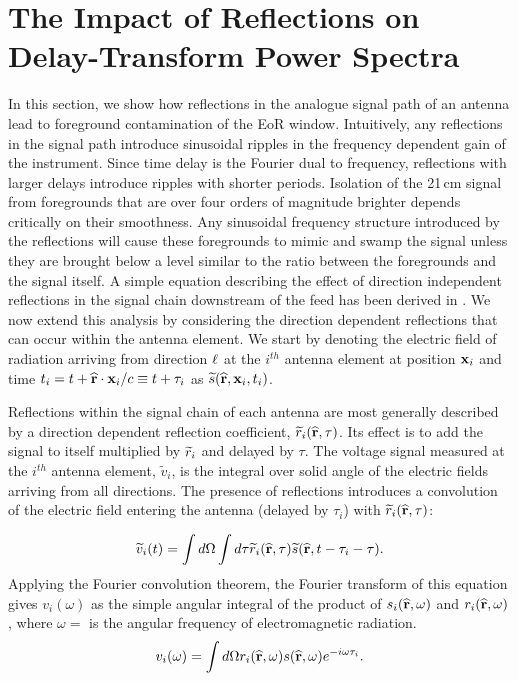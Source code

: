 \documentclass[twocolumn]{emulateapj}
\begin{document}
\section{The Impact of Reflections on Delay-Transform Power Spectra}\label{sec:Formalism}
In this section, we show how reflections in the analogue signal path of an antenna lead to foreground contamination of the EoR window. Intuitively, any reflections in the signal path introduce sinusoidal ripples in the frequency dependent gain of the instrument. Since time delay is the Fourier dual to frequency, reflections with larger delays introduce ripples with shorter periods. Isolation of the 21\,cm signal from foregrounds that are over four orders of magnitude brighter depends critically on their smoothness. Any sinusoidal frequency structure introduced by the reflections will cause these foregrounds to mimic and swamp the signal unless they are brought below a level similar to the ratio between the foregrounds and the signal itself. A simple equation describing the effect of direction independent reflections in the signal chain downstream of the feed has been derived in \citet{EwallWice:2015a}. We now extend this analysis by considering the direction dependent reflections that can occur within the antenna element. 
We start by denoting the electric field of radiation arriving from direction ${\bf \ell}$ at the $i^{th}$ antenna element at position ${\bf x}_i$ and time $t_i = t + \widehat{\bf r} \cdot {\bf x}_i /c \equiv t+\tau_i$ as ${\widetilde{s}}(\widehat{\bf r},{\bf x}_i,t_i)$. 

Reflections within the signal chain of each antenna are most generally described by a direction dependent reflection coefficient, ${\widetilde{r}}_i(\widehat{\bf r},\tau)$. Its effect is to add the signal to itself multiplied by ${\widetilde{r}}_i$ and delayed by $\tau$. The voltage signal measured at the $i^{th}$ antenna element, $\widetilde{v}_i$, is the integral over solid angle of the electric fields arriving from all directions. The presence of reflections introduces a convolution of the electric field entering the antenna (delayed by $\tau_i$) with ${\widetilde{r}}_i(\widehat{\bf r},\tau)$:

\begin{equation}\label{eq:Voltage}
\ftv_i(t) = \int d \Omega \int d \tau \ftr_i(\bl,\tau) \fts(\bl,t- \tau_i - \tau).
\end{equation}
Applying the Fourier convolution theorem, the Fourier transform of this equation gives $v_i(\omega)$ as the simple angular integral of the product of $s_i(\widehat{\bf r},\omega)$ and $r_i(\widehat{\bf r},\omega)$, where $\omega=$ is the angular frequency of electromagnetic radiation.
\begin{equation}
v_i(\omega) = \int d \Omega  r_i(\bl,\omega) s(\bl,\omega) e^{-i \omega \tau_i}.
\end{equation}
\end{document}
